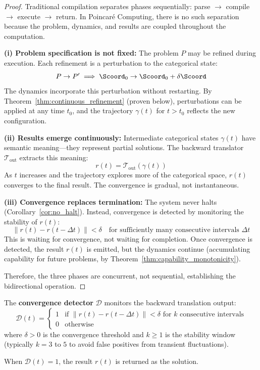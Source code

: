 \begin{proof}
Traditional compilation separates phases sequentially: parse $\to$ compile $\to$ execute $\to$ return. In Poincaré Computing, there is no such separation because the problem, dynamics, and results are coupled throughout the computation.

\textbf{(i) Problem specification is not fixed:} The problem $P$ may be refined during execution. Each refinement is a perturbation to the categorical state:
\begin{equation}
P \to P' \implies \Scoord_0 \to \Scoord_0 + \delta\Scoord
\end{equation}
The dynamics incorporate this perturbation without restarting. By Theorem~\ref{thm:continuous_refinement} (proven below), perturbations can be applied at any time $t_0$, and the trajectory $\gamma(t)$ for $t > t_0$ reflects the new configuration.

\textbf{(ii) Results emerge continuously:} Intermediate categorical states $\gamma(t)$ have semantic meaning---they represent partial solutions. The backward translator $\mathcal{T}_{\text{out}}$ extracts this meaning:
\begin{equation}
r(t) = \mathcal{T}_{\text{out}}(\gamma(t))
\end{equation}
As $t$ increases and the trajectory explores more of the categorical space, $r(t)$ converges to the final result. The convergence is gradual, not instantaneous.

\textbf{(iii) Convergence replaces termination:} The system never halts (Corollary~\ref{cor:no_halt}). Instead, convergence is detected by monitoring the stability of $r(t)$:
\begin{equation}
\|r(t) - r(t-\Delta t)\| < \delta \quad \text{for sufficiently many consecutive intervals } \Delta t
\end{equation}
This is waiting for convergence, not waiting for completion. Once convergence is detected, the result $r(t)$ is emitted, but the dynamics continue (accumulating capability for future problems, by Theorem~\ref{thm:capability_monotonicity}).

Therefore, the three phases are concurrent, not sequential, establishing the bidirectional operation.
\end{proof}

\begin{definition}
\label{def:convergence_detection}
The \textbf{convergence detector} $\mathcal{D}$ monitors the backward translation output:
\begin{equation}
\mathcal{D}(t) = \begin{cases}
1 & \text{if } \|r(t) - r(t-\Delta t)\| < \delta \text{ for } k \text{ consecutive intervals} \\
0 & \text{otherwise}
\end{cases}
\end{equation}
where $\delta > 0$ is the convergence threshold and $k \geq 1$ is the stability window (typically $k = 3$ to $5$ to avoid false positives from transient fluctuations).

When $\mathcal{D}(t) = 1$, the result $r(t)$ is returned as the solution.
\end{definition}

